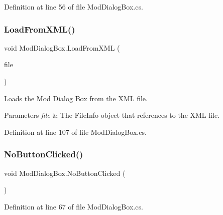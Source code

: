 Definition at line 56 of file Mod\+Dialog\+Box.\+cs.

\mbox{\label{class_mod_dialog_box_aa8f270c2e58f5e79e1650bcabc9c174f}} 
\subsubsection{\texorpdfstring{Load\+From\+X\+M\+L()}{LoadFromXML()}}
{\footnotesize\ttfamily void Mod\+Dialog\+Box.\+Load\+From\+X\+ML (\begin{DoxyParamCaption}\item[{File\+Info}]{file }\end{DoxyParamCaption})}



Loads the Mod Dialog Box from the X\+ML file. 


\begin{DoxyParams}{Parameters}
{\em file} & The File\+Info object that references to the X\+ML file.\\
\hline
\end{DoxyParams}


Definition at line 107 of file Mod\+Dialog\+Box.\+cs.

\mbox{\label{class_mod_dialog_box_ab8285fca595e4a7d5dd6a0e3334dce12}} 
\subsubsection{\texorpdfstring{No\+Button\+Clicked()}{NoButtonClicked()}}
{\footnotesize\ttfamily void Mod\+Dialog\+Box.\+No\+Button\+Clicked (\begin{DoxyParamCaption}{ }\end{DoxyParamCaption})}



Definition at line 67 of file Mod\+Dialog\+Box.\+cs.

\mbox{\label{class_mod_dialog_box_a470352346cc50a60a024b20ea4d525d2}} 
